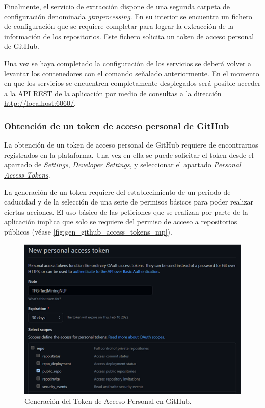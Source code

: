 Finalmente, el servicio de extracción dispone de una segunda carpeta de configuración denominada \textit{gtmprocessing}. En su interior se encuentra un fichero de configuración que se requiere completar para lograr la extracción de la información de los repositorios. Este fichero solicita un token de acceso personal de GitHub.

Una vez se haya completado la configuración de los servicios se deberá volver a levantar los contenedores con el comando señalado anteriormente. En el momento en que los servicios se encuentren completamente desplegados será posible acceder a la API REST de la aplicación por medio de consultas a la dirección \url{http://localhost:6060/}.

\subsubsection{Obtención de un token de acceso personal de GitHub}

La obtención de un token de acceso personal de GitHub requiere de encontrarnos registrados en la plataforma. Una vez en ella se puede solicitar el token desde el apartado de \textit{Settings}, \textit{Developer Settings}, y seleccionar el apartado \href{https://github.com/settings/tokens}{\textit{Personal Access Tokens}}.

La generación de un token requiere del establecimiento de un periodo de caducidad y de la selección de una serie de permisos básicos para poder realizar ciertas acciones. El uso básico de las peticiones que se realizan por parte de la aplicación implica que solo se requiere del permiso de acceso a repositorios públicos (véase \autoref{fig:gen_github_access_tokens_mp}).

\begin{figure}[!ht]
	\centering
    \includegraphics[width=\textwidth]{img/gen_github_access_tokens.png}
	\caption{Generación del Token de Acceso Personal en GitHub.}
	\label{fig:gen_github_access_tokens_mp}
\end{figure}

